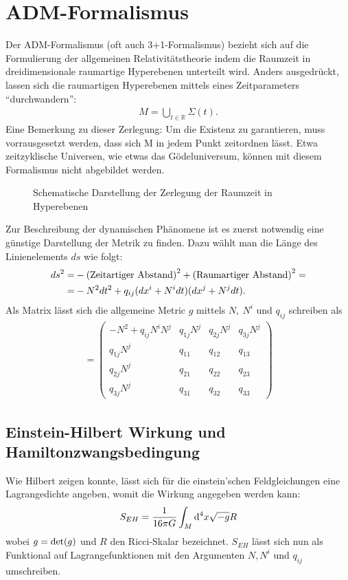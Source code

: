 \documentclass{scrartcl}
\begin{document}
	\section{ADM-Formalismus}
		Der ADM-Formalismus\cite{2008GReGr..40.1997A, gourgoulhon20123+1} (oft auch 3+1-Formalismus) bezieht sich auf die Formulierung der allgemeinen Relativitätstheorie
		indem die Raumzeit in dreidimensionale raumartige Hyperebenen unterteilt wird. Anders ausgedrückt, lassen sich die
		raumartigen Hyperebenen mittels eines Zeitparameters ``durchwandern'':
		\begin{align}
			M=\bigcup_{t\in\mathbb{R}} \Sigma(t).
		\end{align}
		Eine Bemerkung zu dieser Zerlegung: Um die Existenz zu garantieren, muss vorrausgesetzt werden, dass sich M in jedem
		Punkt zeitordnen lässt. Etwa zeitzyklische Universen, wie etwas das G\"odeluniversum, können mit diesem Formalismus nicht
		abgebildet werden.
		\begin{figure}
			\centering
			
			\caption{Schematische Darstellung der Zerlegung der Raumzeit in Hyperebenen}
		\end{figure}
		
		Zur Beschreibung der dynamischen Phänomene ist es zuerst notwendig eine günstige Darstellung der Metrik
		zu finden. Dazu wählt man die Länge des Linienelements $ds$ wie folgt:
		\begin{align}
			ds^2=&-{\rm (Zeitartiger\ Abstand)}^2+{\rm (Raumartiger\ Abstand)}^2=\notag\\
			=&-N^2 dt^2+q_{ij}(dx^i+N^i dt)(dx^j+N^j dt).
		\end{align}
		Als Matrix lässt sich die allgemeine Metric $g$ mittels $N,\ N^i$ und $q_{ij}$ schreiben als
		\begin{align}
			[g]=\left(
			\begin{array}{cccc}
				-N^2+q_{ij}N^i N^j & q_{1j}N^j & q_{2j}N^j & q_{3j}N^j \\
				q_{1j}N^j & q_{11} & q_{12} & q_{13}\\
				q_{2j}N^j & q_{21} & q_{22} & q_{23}\\
				q_{3j}N^j & q_{31} & q_{32} & q_{33}
			\end{array}\right)
			\label{equ:gmatrix}
		\end{align}
	\subsection{Einstein-Hilbert Wirkung und Hamiltonzwangsbedingung}
		Wie Hilbert zeigen konnte, lässt sich für die einstein'schen Feldgleichungen eine Lagrangedichte
		angeben, womit die Wirkung angegeben werden kann:
		\begin{align}
			S_{EH}=\frac{1}{16\pi G}\int_M{\rm d}^4x \sqrt{-g}R
		\end{align}
		wobei $g= {\rm det}(g)$ und $R$ den Ricci-Skalar bezeichnet.
		$S_{EH}$ lässt sich nun als Funktional auf Lagrangefunktionen mit den Argumenten $N,N^i$ und $q_{ij}$ umschreiben.
		
\end{document}
